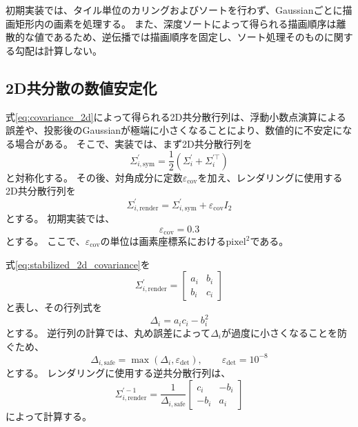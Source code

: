 \documentclass[dvipdfmx]{jlreq}
\begin{document}
初期実装では、タイル単位のカリングおよびソートを行わず、Gaussianごとに描画矩形内の画素を処理する。
また、深度ソートによって得られる描画順序は離散的な値であるため、逆伝播では描画順序を固定し、ソート処理そのものに関する勾配は計算しない。

\subsection{2D共分散の数値安定化}
\label{sec:covariance_stabilization}

式\eqref{eq:covariance_2d}によって得られる2D共分散行列は、浮動小数点演算による誤差や、投影後のGaussianが極端に小さくなることにより、数値的に不安定になる場合がある。
そこで、実装では、まず2D共分散行列を
\begin{equation}
    \Sigma_{i,\mathrm{sym}}^{\prime} = \frac{1}{2} \left(\Sigma_i^{\prime} + \Sigma_i^{\prime\top}\right)
    \label{eq:symmetrized_2d_covariance}
\end{equation}
と対称化する。
その後、対角成分に定数$\varepsilon_{\mathrm{cov}}$を加え、レンダリングに使用する2D共分散行列を
\begin{equation}
    \Sigma_{i,\mathrm{render}}^{\prime} = \Sigma_{i,\mathrm{sym}}^{\prime} + \varepsilon_{\mathrm{cov}}I_2
    \label{eq:stabilized_2d_covariance}
\end{equation}
とする。
初期実装では、
\begin{equation}
    \varepsilon_{\mathrm{cov}}=0.3
\end{equation}
とする。
ここで、$\varepsilon_{\mathrm{cov}}$の単位は画素座標系における$\mathrm{pixel}^2$である。

式\eqref{eq:stabilized_2d_covariance}を
\begin{equation}
    \Sigma_{i,\mathrm{render}}^{\prime} =
    \begin{bmatrix}
        a_i & b_i\\
        b_i & c_i
    \end{bmatrix}
\end{equation}
と表し、その行列式を
\begin{equation}
    \Delta_i=a_ic_i-b_i^2
\end{equation}
とする。
逆行列の計算では、丸め誤差によって$\Delta_i$が過度に小さくなることを防ぐため、
\begin{equation}
    \Delta_{i,\mathrm{safe}} = \max\left(\Delta_i,\varepsilon_{\det}\right), \qquad \varepsilon_{\det}=10^{-8}
    \label{eq:safe_2d_covariance_determinant}
\end{equation}
とする。
レンダリングに使用する逆共分散行列は、
\begin{equation}
    \Sigma_{i,\mathrm{render}}^{\prime-1} = \frac{1}{\Delta_{i,\mathrm{safe}}}
    \begin{bmatrix}
        c_i & -b_i\\
        -b_i & a_i
    \end{bmatrix}
    \label{eq:stabilized_inverse_2d_covariance}
\end{equation}
によって計算する。
\end{document}
